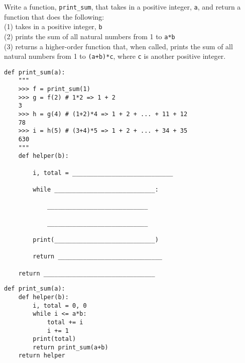 
\begin{blocksection}
\question Write a function, \texttt{print\_sum}, that takes in a positive integer, \texttt{a}, and return a function that does the following: \\
(1) takes in a positive integer, \texttt{b} \\
(2) prints the sum of all natural numbers from 1 to \texttt{a*b} \\
(3) returns a higher-order function that, when called, prints the sum of all natural numbers from 1 to \texttt{(a+b)*c}, where \texttt{c} is another positive integer. \\

\begin{lstlisting}
def print_sum(a):
    """
    >>> f = print_sum(1)
    >>> g = f(2) # 1*2 => 1 + 2
    3
    >>> h = g(4) # (1+2)*4 => 1 + 2 + ... + 11 + 12
    78
    >>> i = h(5) # (3+4)*5 => 1 + 2 + ... + 34 + 35
    630
    """
    def helper(b):

        i, total = ____________________________

        while ____________________________:

            ____________________________

            ____________________________

        print(____________________________)

        return _____________________________

    return _______________________________
\end{lstlisting}

\begin{solution}[1in]
\begin{lstlisting}
def print_sum(a):
    def helper(b):
        i, total = 0, 0
        while i <= a*b:
            total += i
            i += 1
        print(total)
        return print_sum(a+b)
    return helper
\end{lstlisting}
\end{solution}
\end{blocksection}